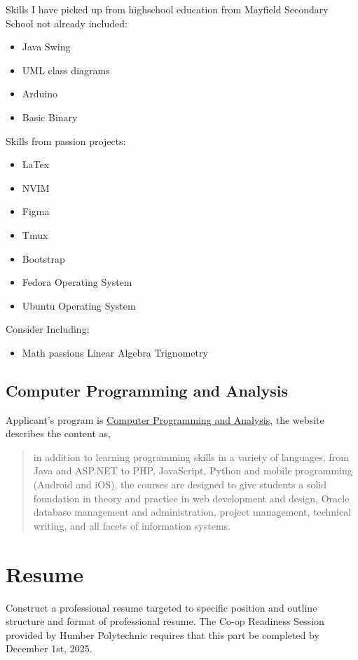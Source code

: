 \documentclass{report}
\begin{document}
	Skills I have picked up from highschool education from Mayfield Secondary School not already included:
	\begin{itemize}
		\item Java Swing
		\item UML class diagrams
		\item Arduino
		\item Basic Binary
	\end{itemize}

	Skills from passion projects:
	\begin{itemize}
		\item LaTex
		\item NVIM
		\item Figma
		\item Tmux
		\item Bootstrap
		\item Fedora Operating System
		\item Ubuntu Operating System
	\end{itemize}

	Consider Including:
	\begin{itemize}
		\item Math passions
			\subitem Linear Algebra
			\subitem Trignometry
	\end{itemize}

	\subsection{Computer Programming and Analysis}
	Applicant's program is \href{https://appliedtechnology.humber.ca/programs/computer-programming-and-analysis.html}{Computer Programming and Analysis}, the website describes the content as, 
	\blockquote[{\cite[para. 2]{CPAN}}]{
		in addition to learning programming skills in a variety of languages, from Java and ASP.NET to PHP, JavaScript, Python and mobile programming (Android and iOS), the courses are designed to give students a solid foundation in theory and practice in web development and design, Oracle database management and administration, project management, technical writing, and all facets of information systems. 
	}

	\newpage
	\section{Resume}
	\label{sec:resume} %
	Construct a professional resume targeted to specific position and outline structure and format of professional resume.
	The Co-op Readiness Session provided by Humber Polytechnic requires that this part be completed by December 1st, 2025.
\end{document}
